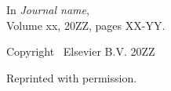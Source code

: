 \documentclass[officiallayout]{tktla}
\begin{document}
\vspace{10pt}
\noindent
In \emph{Journal name}, \\Volume xx, 20ZZ, pages XX-YY.

\vspace{60pt}
\noindent Copyright \textcopyright\ Elsevier B.V. 20ZZ

\noindent Reprinted with permission.

\cleardoublepage
%

\end{document}
